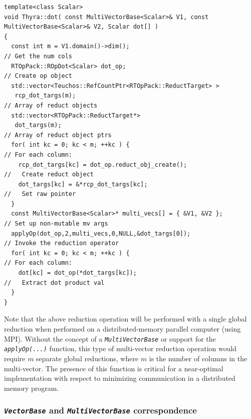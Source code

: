 \documentclass[pdf,ps2pdf,11pt]{SANDreport}
\begin{document}
{\scriptsize\begin{verbatim}
template<class Scalar>
void Thyra::dot( const MultiVectorBase<Scalar>& V1, const MultiVectorBase<Scalar>& V2, Scalar dot[] )
{
  const int m = V1.domain()->dim();                                      // Get the num cols
  RTOpPack::ROpDot<Scalar> dot_op;                                       // Create op object
  std::vector<Teuchos::RefCountPtr<RTOpPack::ReductTarget> >
   rcp_dot_targs(m);                                                     // Array of reduct objects
  std::vector<RTOpPack::ReductTarget*>
   dot_targs(m);                                                         // Array of reduct object ptrs
  for( int kc = 0; kc < m; ++kc ) {                                      // For each column:
    rcp_dot_targs[kc] = dot_op.reduct_obj_create();                      //   Create reduct object
    dot_targs[kc] = &*rcp_dot_targs[kc];                                 //   Set raw pointer
  }
  const MultiVectorBase<Scalar>* multi_vecs[] = { &V1, &V2 };            // Set up non-mutable mv args
  applyOp(dot_op,2,multi_vecs,0,NULL,&dot_targs[0]);                     // Invoke the reduction operator
  for( int kc = 0; kc < m; ++kc ) {                                      // For each column:
    dot[kc] = dot_op(*dot_targs[kc]);                                    //   Extract dot product val
  }
}
\end{verbatim}}

{}\noindent{}Note that the above reduction operation will be performed
with a single global reduction when performed on a distributed-memory
parallel computer (using MPI).  Without the concept of a
{}\texttt{\textit{Multi\-Vector\-Base}} or support for the
{}\texttt{\textit{applyOp(\-...)}} function, this type of multi-vector
reduction operation would require $m$ separate global reductions,
where $m$ is the number of columns in the multi-vector.  The presence
of this function is critical for a near-optimal implementation with
respect to minimizing communication in a distributed memory program.

%
\subsubsection{\texttt{\textit{Vector\-Base}} and {}\texttt{\textit{Multi\-Vector\-Base}} correspondence}
\label{tsfcore:sec:vector_vs_multivector}
%
\end{document}

